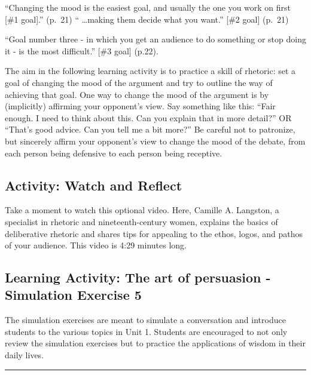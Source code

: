 \documentclass[
]{book}
\begin{document}
``Changing the mood is the easiest goal, and usually the one you work on first {[}\#1 goal{]}.'' (p.~21)
`` \ldots making them decide what you want.'' {[}\#2 goal{]} (p.~21)

``Goal number three - in which you get an audience to do something or stop doing it - is the most difficult.'' {[}\#3 goal{]} (p.22).

The aim in the following learning activity is to practice a skill of rhetoric: set a goal of changing the mood of the argument and try to outline the way of achieving that goal. One way to change the mood of the argument is by (implicitly) affirming your opponent's view. Say something like this: ``Fair enough. I need to think about this. Can you explain that in more detail?'' OR ``That's good advice. Can you tell me a bit more?'' Be careful not to patronize, but sincerely affirm your opponent's view to change the mood of the debate, from each person being defensive to each person being receptive.

\hypertarget{activity-watch-and-reflect-5}{%
\subsection*{Activity: Watch and Reflect}\label{activity-watch-and-reflect-5}}

\begin{reflect}
Take a moment to watch this optional video. Here, Camille A. Langston, a specialist in rhetoric and nineteenth-century women, explains the basics of deliberative rhetoric and shares tips for appealing to the ethos, logos, and pathos of your audience. This video is 4:29 minutes long.
\end{reflect}

\hypertarget{learning-activity-the-art-of-persuasion---simulation-exercise-5}{%
\subsection{Learning Activity: The art of persuasion - Simulation Exercise 5}\label{learning-activity-the-art-of-persuasion---simulation-exercise-5}}

The simulation exercises are meant to simulate a conversation and introduce students to the various topics in Unit 1. Students are encouraged to not only review the simulation exercises but to practice the applications of wisdom in their daily lives.

\begin{center}\rule{0.5\linewidth}{0.5pt}\end{center}
\end{document}
